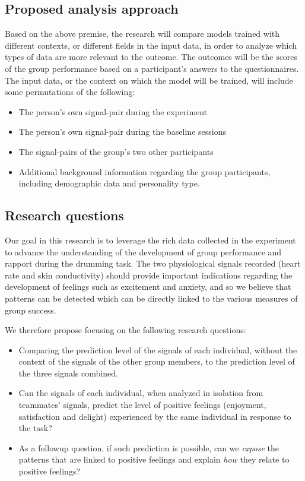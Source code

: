 \documentclass[a4paper, 11pt]{article}      %
\begin{document}
\subsection{Proposed analysis approach}
Based on the above premise, the research will compare models trained with different contexts, or different fields in the input data, in order to analyze which types of data are more relevant to the outcome. The outcomes will be the scores of the group performance based on a participant's answers to the questionnaires. The input data, or the context on which the model will be trained, will include some permutations of the following:
\begin{itemize}
    \item The person's own signal-pair during the experiment
    \item The person's own signal-pair during the baseline sessions
    \item The signal-pairs of the  group's two other participants 
    \item Additional background information regarding the group participants, including demographic data and personality type.
\end{itemize}



\subsection{Research questions}
Our goal in this research is to leverage the rich data collected in the experiment to advance the understanding of the development of group performance and rapport during the drumming task. The two physiological signals recorded (heart rate and skin conductivity) should provide important indications regarding the development of feelings such as excitement and anxiety, and so we believe that patterns can be detected which can be directly linked to the various measures of group success. 

We therefore propose focusing on the following research questions:
\begin{itemize}
\item 
Comparing the prediction level of the signals of each individual, without the context of the signals of the other group members, to the prediction level of the three signals combined. 
\item 
Can the signals of each individual, when analyzed in isolation from teammates' signals, predict the level of positive feelings (enjoyment, satisfaction and delight) experienced by the same individual in response to the task?
\item
As a followup question, if such prediction is possible, can we \emph{expose} the patterns that are linked to positive feelings and explain \emph{how} they relate to positive feelings?
\end{itemize}
\end{document}
